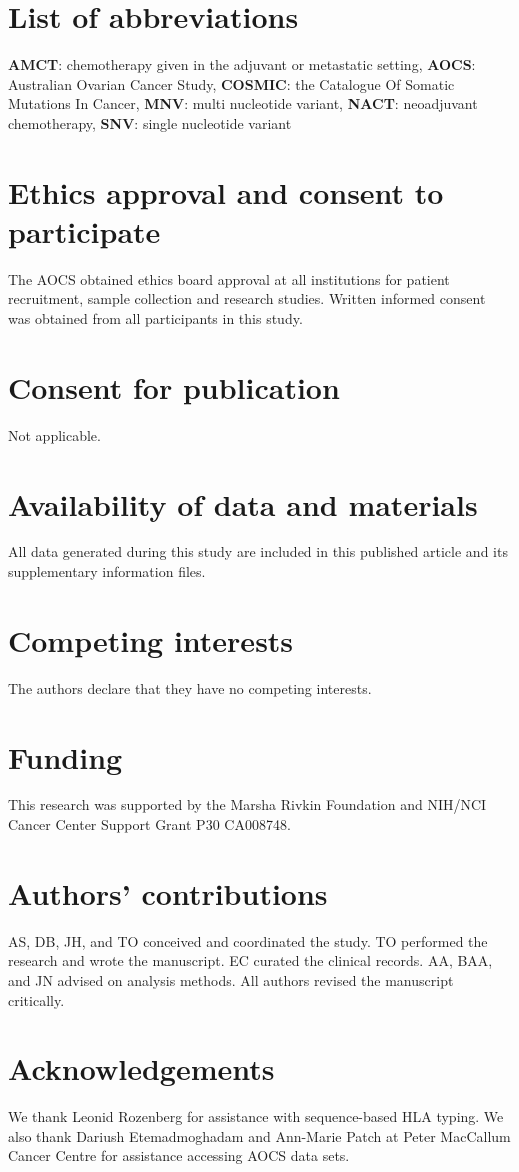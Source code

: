 \section{List of abbreviations}
\textbf{AMCT}: chemotherapy given in the adjuvant or metastatic setting, \textbf{AOCS}: Australian Ovarian Cancer Study, \textbf{COSMIC}: the Catalogue Of Somatic Mutations In Cancer, \textbf{MNV}: multi nucleotide variant, \textbf{NACT}: neoadjuvant chemotherapy, \textbf{SNV}: single nucleotide variant

\section{Ethics approval and consent to participate}
The AOCS obtained ethics board approval at all institutions for patient recruitment, sample collection and research studies. Written informed consent was obtained from all participants in this study.

\section{Consent for publication}
Not applicable.

\section{Availability of data and materials}
All data generated during this study are included in this published article and its supplementary information files.

\section{Competing interests}
The authors declare that they have no competing interests.

\section{Funding}
This research was supported by the Marsha Rivkin Foundation and NIH/NCI Cancer Center Support Grant P30 CA008748.

\section{Authors' contributions}
AS, DB, JH, and TO conceived and coordinated the study. TO performed the research and wrote the manuscript. EC curated the clinical records. AA, BAA, and JN advised on analysis methods.  All authors revised the manuscript critically.

\section{Acknowledgements}
We thank Leonid Rozenberg for assistance with sequence-based HLA typing. We also thank Dariush Etemadmoghadam and Ann-Marie Patch at Peter MacCallum Cancer Centre for assistance accessing AOCS data sets.
